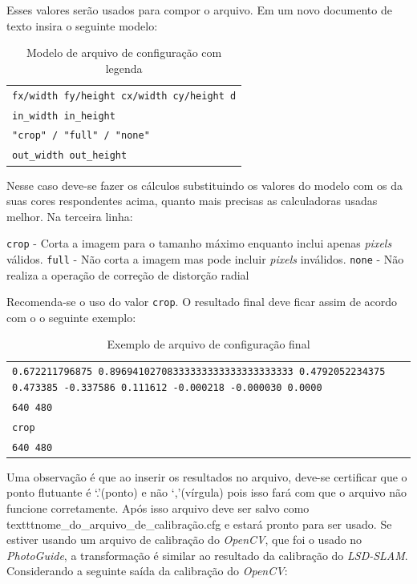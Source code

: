 Esses valores serão usados para compor o arquivo. Em um novo documento de texto insira o seguinte modelo:

\begin{table}[!ht]\label{tb:7}
\begin{tabular}{| p{\textwidth}|}
\hline
\texttt{fx/width fy/height cx/width cy/height d}\\
\texttt{in\_width in\_height}\\
\texttt{"crop" / "full" / "none"}\\
\texttt{out\_width out\_height}\\
\hline
\end{tabular}
\caption{Modelo de arquivo de configuração com legenda}
\end{table}

Nesse caso deve-se fazer os cálculos substituindo os valores do modelo com os da suas cores respondentes acima, quanto mais precisas as calculadoras usadas melhor. Na terceira linha:

\texttt{crop} - Corta a imagem para o tamanho máximo enquanto inclui apenas \textit{pixels} válidos.
\texttt{full} - Não corta a imagem mas pode incluir \textit{pixels} inválidos.
\texttt{none} - Não realiza a operação de correção de distorção radial

Recomenda-se o uso do valor \texttt{crop}. O resultado final deve ficar assim de acordo com o o seguinte exemplo:

\begin{table}[!ht]\label{tb:8}
\begin{tabular}{| p{\textwidth}|}
\hline
\texttt{0.672211796875 0.89694102708333333333333333333333 0.4792052234375 0.473385 -0.337586 0.111612 -0.000218 -0.000030 0.0000}\\
\texttt{640 480}\\
\texttt{crop}\\
\texttt{640 480}\\
\hline
\end{tabular}
\caption{Exemplo de arquivo de configuração final}
\end{table}

Uma observação é que ao inserir os resultados no arquivo, deve-se certificar que o ponto flutuante é ‘.’(ponto) e não ‘,’(vírgula) pois isso fará com que o arquivo não funcione corretamente. Após isso arquivo deve ser salvo como texttt{nome\_do\_arquivo\_de\_calibração.cfg} e estará pronto para ser usado. Se estiver usando um arquivo de calibração do \textit{OpenCV}, que foi o usado no \textit{PhotoGuide}, a transformação é similar ao resultado da calibração do \textit{LSD-SLAM}. Considerando a seguinte saída da calibração do \textit{OpenCV}:

